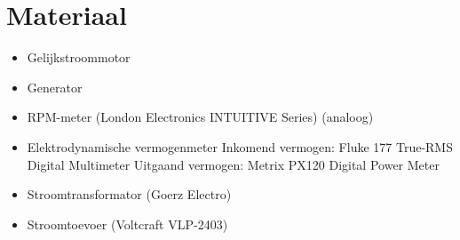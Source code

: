 \section{Materiaal}
\begin{itemize}
    \item Gelijkstroommotor
    \item Generator
    \item RPM-meter (London Electronics INTUITIVE Series) (analoog)
    \item Elektrodynamische vermogenmeter
        Inkomend vermogen: Fluke 177 True-RMS Digital Multimeter
        Uitgaand vermogen: Metrix PX120 Digital Power Meter
    \item Stroomtransformator (Goerz Electro)
    \item Stroomtoevoer (Voltcraft VLP-2403)
\end{itemize}
